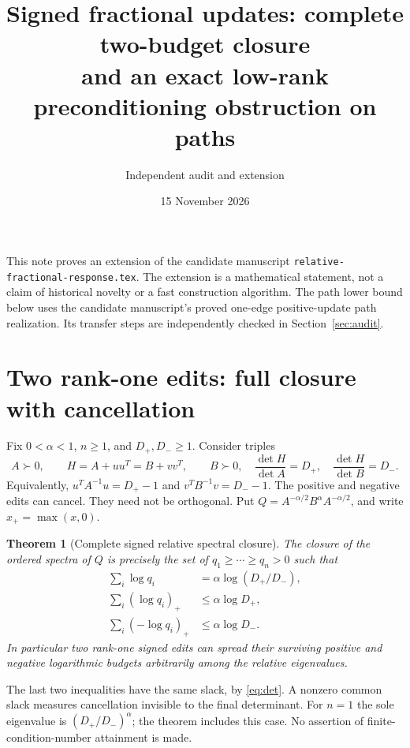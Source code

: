 \documentclass[11pt]{article}
\title{Signed fractional updates: complete two-budget closure\\
and an exact low-rank preconditioning obstruction on paths}
\author{Independent audit and extension}
\date{15 November 2026}
\newtheorem{theorem}{Theorem}[section]
\begin{document}
\maketitle

This note proves an extension of the candidate manuscript
\texttt{relative-fractional-response.tex}. The extension is a mathematical
statement, not a claim of historical novelty or a fast construction algorithm.
The path lower bound below uses the candidate manuscript's proved one-edge
positive-update path realization. Its transfer steps are independently
checked in Section~\ref{sec:audit}.

\section{Two rank-one edits: full closure with cancellation}

Fix $0<\alpha<1$, $n\ge1$, and $D_+,D_-\ge1$. Consider triples
\[
 A\succ0,\qquad H=A+uu^T=B+vv^T,\qquad B\succ0,
 \quad
 \frac{\det H}{\det A}=D_+,\quad
 \frac{\det H}{\det B}=D_-.
\]
Equivalently, $u^TA^{-1}u=D_+-1$ and $v^TB^{-1}v=D_--1$.
The positive and negative edits can cancel. They need not be orthogonal.
Put $Q=A^{-\alpha/2}B^\alpha A^{-\alpha/2}$, and write $x_+=\max(x,0)$.

\begin{theorem}[Complete signed relative spectral closure]
\label{thm:signed}
The closure of the ordered spectra of $Q$ is precisely the set of
$q_1\ge\cdots\ge q_n>0$ such that
\begin{align}
 \sum_i\log q_i&=\alpha\log(D_+/D_-),\label{eq:det}\\
 \sum_i(\log q_i)_+&\le\alpha\log D_+,\label{eq:pos}\\
 \sum_i(-\log q_i)_+&\le\alpha\log D_-.\label{eq:neg}
\end{align}
In particular two rank-one signed edits can spread their surviving positive
and negative logarithmic budgets arbitrarily among the relative eigenvalues.
\end{theorem}

The last two inequalities have the same slack, by \eqref{eq:det}. A
nonzero common slack measures cancellation invisible to the final determinant.
For $n=1$ the sole eigenvalue is $(D_+/D_-)^\alpha$; the theorem includes
this case. No assertion of finite-condition-number attainment is made.
\end{document}
